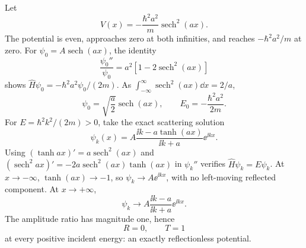 Let
\begin{equation}
V(x)=-\frac{\hbar^2a^2}{m}\operatorname{sech}^2(ax).
\end{equation}
The potential is even, approaches zero at both
infinities, and reaches $-\hbar^2a^2/m$ at zero.
For $\psi_0=A\operatorname{sech}(ax)$,
the identity
\begin{equation}
\frac{\psi_0''}{\psi_0}=
a^2[1-2\operatorname{sech}^2(ax)]
\end{equation}
shows
$\hat H\psi_0=-\hbar^2a^2\psi_0/(2m)$.
As $\int_{-\infty}^{\infty}
\operatorname{sech}^2(ax)\dd x=2/a$,
\begin{equation}
\boxed{\psi_0=\sqrt{\frac a2}\operatorname{sech}(ax),
\qquad E_0=-\frac{\hbar^2a^2}{2m}}.
\end{equation}
For $E=\hbar^2k^2/(2m)>0$,
take the exact scattering solution
\begin{equation}
\psi_k(x)=A\frac{\ii k-a\tanh(ax)}{\ii k+a}
\ee^{\ii kx}.
\end{equation}
Using $(\tanh ax)'=a\operatorname{sech}^2(ax)$
and $(\operatorname{sech}^2 ax)'=
-2a\operatorname{sech}^2(ax)\tanh(ax)$
in $\psi_k''$ verifies $\hat H\psi_k=E\psi_k$.
At $x\to-\infty$, $\tanh(ax)\to-1$,
so $\psi_k\to A\ee^{\ii kx}$, with no
left-moving reflected component. At
$x\to+\infty$,
\begin{equation}
\psi_k\to A
\frac{\ii k-a}{\ii k+a}\ee^{\ii kx}.
\end{equation}
The amplitude ratio has magnitude one, hence
\begin{equation}
\boxed{R=0,\qquad T=1}
\end{equation}
at every positive incident energy: an exactly
reflectionless potential.

